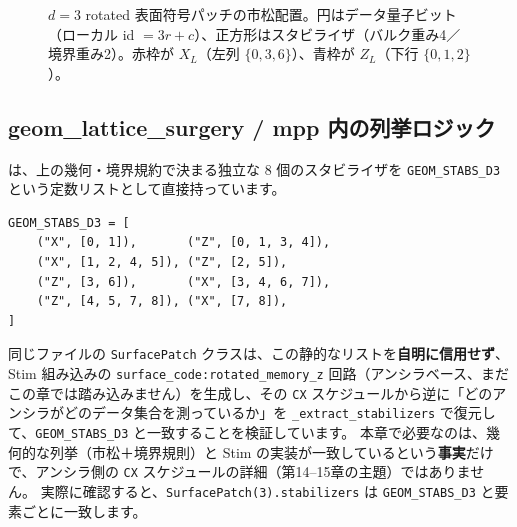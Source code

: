 \begin{figure}[htbp]
  \centering
  \caption{$d=3$ rotated 表面符号パッチの市松配置。円はデータ量子ビット（ローカル id $=3r+c$）、正方形はスタビライザ（バルク重み4／境界重み2）。赤枠が $X_L$（左列 $\{0,3,6\}$）、青枠が $Z_L$（下行 $\{0,1,2\}$）。}
  \label{fig:d3_patch}
\end{figure}

\subsection{geom\_lattice\_surgery / mpp 内の列挙ロジック}

 は、上の幾何・境界規約で決まる独立な 8 個のスタビライザを \texttt{GEOM\_STABS\_D3} という定数リストとして直接持っています。

\begin{lstlisting}[caption={$d=3$ パッチのスタビライザ列挙（\codepath{src/stages/01_mpp/src/ftqc/surface_patch.py}）},label=lst:geom_stabs_d3]
GEOM_STABS_D3 = [
    ("X", [0, 1]),       ("Z", [0, 1, 3, 4]),
    ("X", [1, 2, 4, 5]), ("Z", [2, 5]),
    ("Z", [3, 6]),       ("X", [3, 4, 6, 7]),
    ("Z", [4, 5, 7, 8]), ("X", [7, 8]),
]
\end{lstlisting}

同じファイルの \texttt{SurfacePatch} クラスは、この静的なリストを\textbf{自明に信用せず}、Stim 組み込みの \texttt{surface\_code:rotated\_memory\_z} 回路（アンシラベース、まだこの章では踏み込みません）を生成し、その \texttt{CX} スケジュールから逆に「どのアンシラがどのデータ集合を測っているか」を \texttt{\_extract\_stabilizers} で復元して、\texttt{GEOM\_STABS\_D3} と一致することを検証しています。
本章で必要なのは、幾何的な列挙（市松＋境界規則）と Stim の実装が一致しているという\textbf{事実}だけで、アンシラ側の \texttt{CX} スケジュールの詳細（第14–15章の主題）ではありません。
実際に確認すると、\texttt{SurfacePatch(3).stabilizers} は \texttt{GEOM\_STABS\_D3} と要素ごとに一致します。

